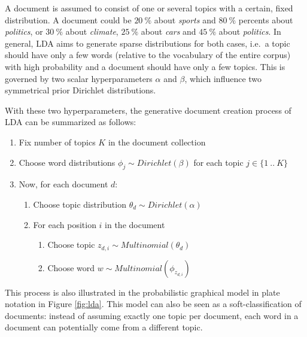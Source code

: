 \documentclass[
        a4paper,
        titlepage,
        twoside,
        parskip
        ]{scrbook}
\theoremstyle{break}
\begin{document}
A document is assumed to consist of one or several topics with a certain, fixed distribution.
A document could be $20~\%$ about \emph{sports} and $80~\%$ percents about \emph{politics}, or $30~\%$ about \emph{climate}, $25~\%$ about \emph{cars} and $45~\%$ about \emph{politics}.
In general, LDA aims to generate sparse distributions for both cases, i.e.\ a topic should have only a few words (relative to the vocabulary of the entire corpus) with high probability and a document should have only a few topics.
This is governed by two scalar hyperparameters $\alpha$ and $\beta$, which influence two symmetrical prior Dirichlet distributions.

With these two hyperparameters, the generative document creation process of LDA can be summarized as follows:
\begin{enumerate}
       \item Fix number of topics $K$ in the document collection
       \item Choose word distributions $\phi_j \sim Dirichlet(\beta)$ for each topic $j \in \{1~..~K\}$
       \item Now, for each document $d$:
       \begin{enumerate}
              \item Choose topic distribution $\theta_d \sim Dirichlet(\alpha)$
              \item For each position $i$ in the document
              \begin{enumerate}
                     \item Choose topic $z_{d,i} \sim Multinomial(\theta_d)$
                     \item Choose word $w \sim Multinomial(\phi_{z_{d,i}})$
              \end{enumerate}
       \end{enumerate}
\end{enumerate}
This process is also illustrated in the probabilistic graphical model in plate notation in Figure \ref{fig:lda}.
This model can also be seen as a soft-classification of documents: instead of assuming exactly one topic per document, each word in a document can potentially come from a different topic.
\end{document}
